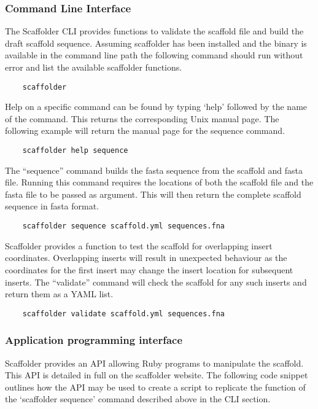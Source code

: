 \documentclass[10pt]{bmc_article}
\newenvironment{bmcformat}{\begin{raggedright}\baselineskip20pt\sloppy\setboolean{publ}{false}}{\end{raggedright}\baselineskip20pt\sloppy}
\begin{document}
\begin{bmcformat}
\subsubsection*{Command Line Interface} %

The Scaffolder CLI provides functions to validate the scaffold file and build
the draft scaffold sequence. Assuming scaffolder has been installed and the
binary is available in the command line path the following command should run
without error and list the available scaffolder functions. \pb

  \begin{verbatim}
    scaffolder
  \end{verbatim}

Help on a specific command can be found by typing `help' followed by the name
of the command. This returns the corresponding Unix manual page. The following
example will return the manual page for the sequence command. \pb

  \begin{verbatim}
    scaffolder help sequence
  \end{verbatim} 

The ``sequence'' command builds the fasta sequence from the scaffold and fasta
file. Running this command requires the locations of both the scaffold file and
the fasta file to be passed as argument. This will then return the complete
scaffold sequence in fasta format. \pb

  \begin{verbatim}
    scaffolder sequence scaffold.yml sequences.fna
  \end{verbatim}

Scaffolder provides a function to test the scaffold for overlapping insert
coordinates. Overlapping inserts will result in unexpected behaviour as the
coordinates for the first insert may change the insert location for subsequent
inserts. The ``validate'' command will check the scaffold for any such inserts
and return them as a YAML list. \pb

  \begin{verbatim}
    scaffolder validate scaffold.yml sequences.fna
  \end{verbatim}

\subsubsection*{Application programming interface} %

Scaffolder provides an API allowing Ruby programs to manipulate the scaffold.
This API is detailed in full on the scaffolder website. The following code
snippet outlines how the API may be used to create a script to replicate the
function of the `scaffolder sequence' command described above in the CLI
section. \pb


\end{bmcformat}
\end{document}
